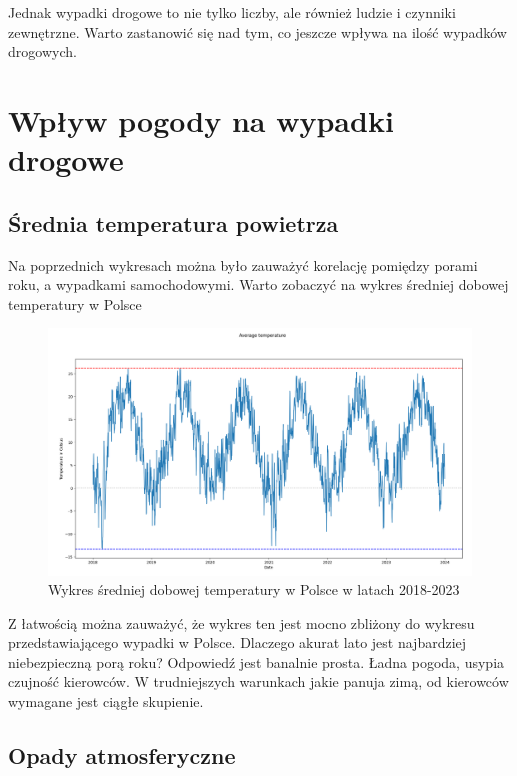 \documentclass{article}
\begin{document}
Jednak wypadki drogowe to nie tylko liczby, ale również ludzie i czynniki zewnętrzne. Warto zastanowić się nad tym, co jeszcze wpływa na ilość wypadków drogowych.

\section{Wpływ pogody na wypadki drogowe}

\subsection{Średnia temperatura powietrza}

Na poprzednich wykresach można było zauważyć korelację pomiędzy porami roku, a wypadkami samochodowymi.
Warto zobaczyć na wykres średniej dobowej temperatury w Polsce

\begin{figure}[h]
    \flushleft
    \includegraphics[width=1\textwidth]{visualization/avg_temp.png}
    \caption{Wykres średniej dobowej temperatury w Polsce w latach 2018-2023}
    \label{fig:temp_chart}
\end{figure}

Z łatwością można zauważyć, że wykres ten jest mocno zbliżony do wykresu przedstawiającego wypadki w Polsce.
Dlaczego akurat lato jest najbardziej niebezpieczną porą roku? Odpowiedź jest banalnie prosta. 
Ładna pogoda, usypia czujność kierowców. W trudniejszych warunkach jakie panuja zimą, od kierowców wymagane jest ciągłe skupienie.

\subsection{Opady atmosferyczne}
\end{document}
